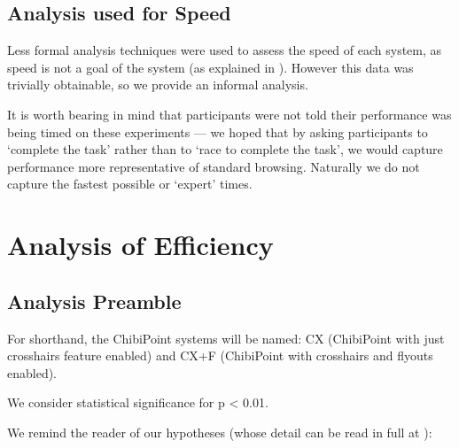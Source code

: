 \documentclass[11pt,openright,a4paper]{report}
\begin{document}
\subsection{Analysis used for Speed}
Less formal analysis techniques were used to assess the speed of each system, as speed is not a goal of the system (as explained in ). However this data was trivially obtainable, so we provide an informal analysis.

It is worth bearing in mind that participants were not told their performance was being timed on these experiments --- we hoped that by asking participants to `complete the task' rather than to `race to complete the task', we would capture performance more representative of standard browsing. Naturally we do not capture the fastest possible or `expert' times.

\section{Analysis of Efficiency}
\subsection{Analysis Preamble}
For shorthand, the ChibiPoint systems will be named: CX (ChibiPoint with just crosshairs feature enabled) and CX+F (ChibiPoint with crosshairs and flyouts enabled).

We consider statistical significance for p < 0.01.

We remind the reader of our hypotheses (whose detail can be read in full at ):

\textbf{\hypone}\\
\textbf{\hyptwo}\\
\clearpage
\end{document}
